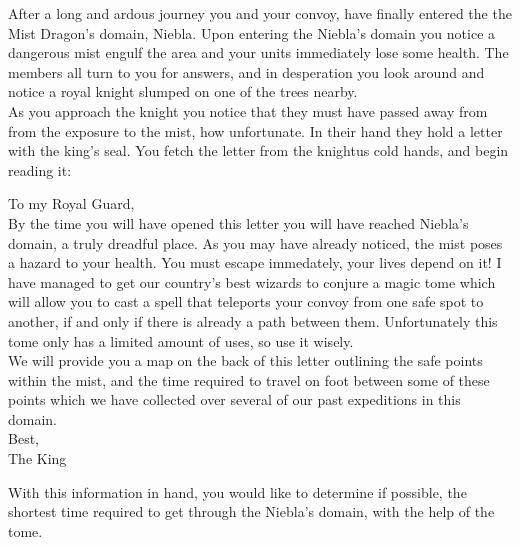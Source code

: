 


\noindent After a long and ardous journey you and your convoy, have finally entered the the Mist Dragon's domain,
Niebla. Upon entering the Niebla's domain you notice a dangerous mist engulf the area and your units immediately lose
some health. The members all turn to you for answers, and in desperation you look around and notice a royal knight
slumped on one of the trees nearby. \\

\noindent As you approach the knight you notice that they must have passed away from from the exposure to the mist, how
unfortunate. In their hand they hold a letter with the king's seal. You fetch the letter from the knightus cold hands,
and begin reading it: \\

\begin{minipage}[t]{6in}
To my Royal Guard, \\

By the time you will have opened this letter you will have reached Niebla's domain, a truly dreadful place. As you may
have already noticed, the mist poses a hazard to your health.  You must escape immedately, your lives depend on it!
I have managed to get our country's best wizards to conjure a magic tome which will allow you to cast a spell that
teleports your convoy from one safe spot to another, if and only if there is already a path between them. Unfortunately
this tome only has a limited amount of uses, so use it wisely. \\

We will provide you a map on the back of this letter outlining the safe points within the mist, and  the time required
to travel on foot between some of these points which we have collected over several of our past expeditions
in this domain.\\

Best,\\
The King \\
\end{minipage}



\noindent With this information in hand, you would like to determine if possible,  the shortest time required to get
through the Niebla's domain, with the help of the tome. \\

